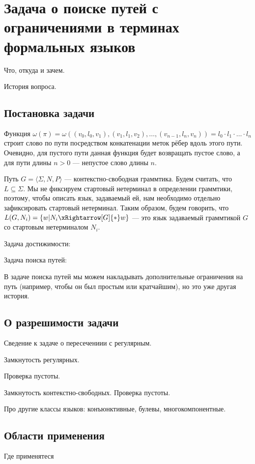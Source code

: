 \section{Задача о поиске путей с ограничениями в терминах формальных языков}


Что, откуда и зачем.

История вопроса.


\subsection{Постановка задачи }



Функция $\omega(\pi) = \omega((v_0, l_0, v_1),(v_1,l_1,v_2),\dots,(v_{n-1},l_n,v_n)) = l_0 \cdot l_1 \cdot \ldots \cdot l_n $ строит слово по пути посредством конкатенации меток рёбер вдоль этого пути.
Очевидно, для пустого пути данная функция будет возвращать пустое слово, а для пути длины $n  > 0$ --- непустое слово длины $n$.

Путь $G = \langle \Sigma, N, P \rangle$ --- контекстно-свободная граммтика.
Будем считать, что $L \subseteq \Sigma$.
Мы не фиксируем стартовый нетерминал в определении граммтики, поэтому, чтобы описать язык, задаваемый ей, нам необходимо отдельно зафиксировать стартовый нетерминал.
Таким образом, будем говорить, что $L(G,N_i) = \{ w | N_i \xRightarrow[G]{*} w  \}$ --- это язык задаваемый граммтикой $G$ со стартовым нетерминалом $N_i$.

Задача достижимости:

Задача поиска путей:

В задаче поиска путей мы можем накладывать дополнительные ограничения на путь (например, чтобы он был простым или кратчайшим), но это уже другая история.


\subsection{О разрешимости задачи}

Сведение к задаче о пересечениии с регулярным.

Замкнутость регулярных.

Проверка пустоты.

Замкнутость контекстно-свободных.
Проверка пустоты.

Про другие классы языков: конъюнктивные, булевы, многокомпонентные.

\subsection{Области применения}
Где применятеся

